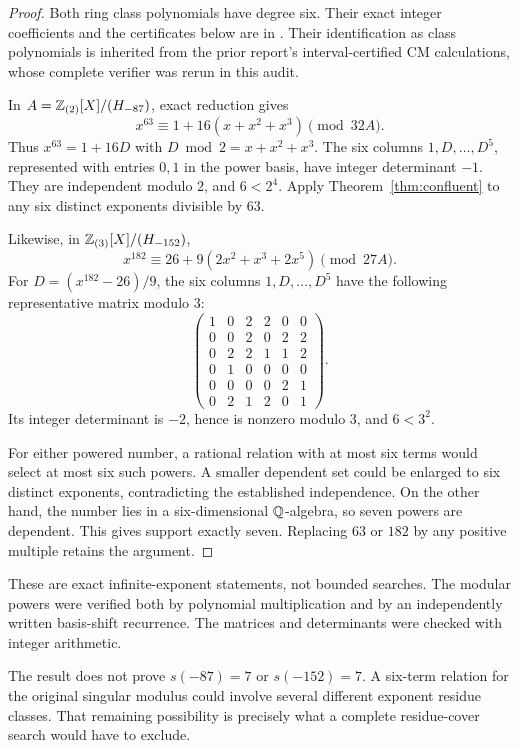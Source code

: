 \begin{proof}
Both ring class polynomials have degree six. Their exact integer coefficients and the certificates below are in . Their identification as class polynomials is inherited from the prior report's interval-certified CM calculations, whose complete verifier was rerun in this audit.\cite{prior_sparse}

In $A=\mathbb Z_{(2)}[X]/(H_{-87})$, exact reduction gives
\[
 x^{63}\equiv 1+16(x+x^2+x^3)\pmod {32A}.
\]
Thus $x^{63}=1+16D$ with $D\bmod2=x+x^2+x^3$. The six columns $1,D,\ldots,D^5$, represented with entries $0,1$ in the power basis, have integer determinant $-1$. They are independent modulo $2$, and $6<2^4$. Apply Theorem~\ref{thm:confluent} to any six distinct exponents divisible by $63$.

Likewise, in $\mathbb Z_{(3)}[X]/(H_{-152})$,
\[
 x^{182}\equiv26+9(2x^2+x^3+2x^5)\pmod {27A}.
\]
For $D=(x^{182}-26)/9$, the six columns $1,D,\ldots,D^5$ have the following representative matrix modulo $3$:
\[
 \begin{pmatrix}
 1&0&2&2&0&0\\
 0&0&2&0&2&2\\
 0&2&2&1&1&2\\
 0&1&0&0&0&0\\
 0&0&0&0&2&1\\
 0&2&1&2&0&1
 \end{pmatrix}.
\]
Its integer determinant is $-2$, hence is nonzero modulo $3$, and $6<3^2$.

For either powered number, a rational relation with at most six terms would select at most six such powers. A smaller dependent set could be enlarged to six distinct exponents, contradicting the established independence. On the other hand, the number lies in a six-dimensional $\mathbb Q$-algebra, so seven powers are dependent. This gives support exactly seven. Replacing $63$ or $182$ by any positive multiple retains the argument.
\end{proof}

These are exact infinite-exponent statements, not bounded searches. The modular powers were verified both by polynomial multiplication and by an independently written basis-shift recurrence. The matrices and determinants were checked with integer arithmetic.

The result does not prove $s(-87)=7$ or $s(-152)=7$. A six-term relation for the original singular modulus could involve several different exponent residue classes. That remaining possibility is precisely what a complete residue-cover search would have to exclude.

